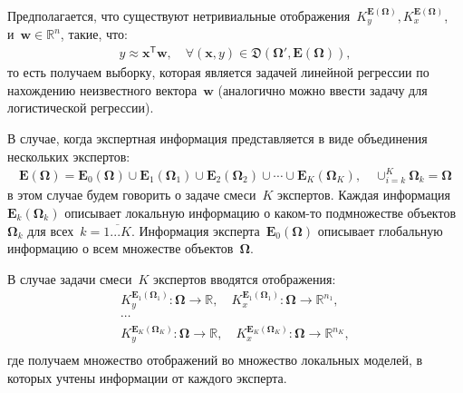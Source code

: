 \documentclass[12pt, twoside]{article}
\numberwithin{equation}{section}
\begin{document}
Предполагается, что существуют нетривиальные отображения~$K_y^{\bm{E}\left(\bm{\Omega}\right)}, K_x^{\bm{E}\left(\bm{\Omega}\right)}$, и~$\textbf{w}\in\mathbb{R}^{n}$, такие, что:
\begin{equation}
\label{eq:st:4}
\begin{aligned}
y \approx \textbf{x}^{\mathsf{T}}\textbf{w}, \quad \forall\left(\textbf{x}, y\right)\in\mathfrak{D}\left(\bm{\Omega}',\bm{E}\left(\bm{\Omega}\right)\right),
\end{aligned}
\end{equation}
то есть получаем выборку, которая является задачей линейной регрессии по нахождению неизвестного вектора~$\textbf{w}$ (аналогично можно ввести задачу для логистической регрессии).

В случае, когда экспертная информация представляется в виде объединения нескольких экспертов:
\begin{equation}
\label{eq:st:5}
\begin{aligned}
\bm{E}\left(\bm{\Omega}\right) = \bm{E}_0\left(\bm{\Omega}\right)\cup\bm{E}_1\left(\bm{\Omega}_1\right)\cup\bm{E}_2\left(\bm{\Omega}_2\right)\cup\cdots\cup\bm{E}_K\left(\bm{\Omega}_K\right), \quad \cup_{i=k}^{K}\bm{\Omega}_k=\bm{\Omega}
\end{aligned}
\end{equation}
в этом случае будем говорить о задаче смеси~$K$ экспертов. Каждая информация~$\bm{E}_k\left(\bm{\Omega}_k\right)$ описывает локальную информацию о каком-то подмножестве объектов~$\bm{\Omega}_k$ для всех~$k=\overline{1...K}$. Информация эксперта~$\bm{E}_0\left(\bm{\Omega}\right)$ описывает глобальную информацию о всем множестве объектов~$\bm{\Omega}$.

В случае задачи смеси~$K$ экспертов вводятся отображения:
\begin{equation}
\label{eq:st:6}
\begin{aligned}
K_y^{\bm{E}_1\left(\bm{\Omega}_1\right)} :\bm{\Omega}\to \mathbb{R}, \quad K_x^{\bm{E}_1\left(\bm{\Omega}_1\right)} :\bm{\Omega}\to \mathbb{R}^{n_1},\\
\cdots\\
K_y^{\bm{E}_K\left(\bm{\Omega}_K\right)} :\bm{\Omega}\to \mathbb{R}, \quad K_x^{\bm{E}_K\left(\bm{\Omega}_K\right)} :\bm{\Omega}\to \mathbb{R}^{n_K},\\
\end{aligned}
\end{equation}
где получаем множество отображений во множество локальных моделей, в которых учтены информации от каждого эксперта.
\end{document}
